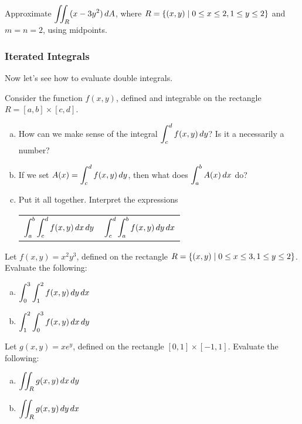\documentclass[notes]{subfiles}
\begin{document}
		\begin{ex}
			Approximate $\displaystyle \iint_R (x-3y^2)\, dA$, where $R = \left\lbrace (x,y)\mid 0\leq x\leq 2, 1\leq y\leq 2 \right\rbrace$ and $m=n=2$, using midpoints.
		\end{ex}
			\newpage
			
	\subsubsection*{Iterated Integrals}
		Now let's see how to evaluate double integrals.
		\begin{ex}
			Consider the function $f(x,y)$, defined and integrable on the rectangle $R = [a,b]\times[c,d]$.
			\begin{enumerate}[(a)]
				\item How can we make sense of the integral $\displaystyle\int_c^d f(x,y)\, dy$?  Is it a necessarily a number?
				\item If we set $A(x) = \displaystyle\int_c^d f(x,y)\, dy$, then what does $\displaystyle \int_a^b A(x)\, dx$ do?
				\item Put it all together.  Interpret the expressions
					\begin{center}
						\begin{tabular}{cc}
							$\displaystyle \int_a^b\int_c^d f(x,y)\, dx\,dy$ & $\displaystyle \int_c^d\int_a^b f(x,y)\, dy\,dx$
						\end{tabular}
					\end{center}
			\end{enumerate}
		\end{ex}
	
		\begin{ex}
			Let $f(x,y) = x^2y^3$, defined on the rectangle $R = \left\lbrace (x,y)\mid 0\leq x\leq 3,1\leq y\leq 2 \right\rbrace$. Evaluate the following:
			\begin{enumerate}[(a)]
				\item $\displaystyle \int_0^3 \int_1^2 f(x,y)\,dy\,dx$
					\vs{1}
					\newpage
					
				\item $\displaystyle \int_1^2\int_0^3 f(x,y)\,dx\,dy$
					\vs{1}
			\end{enumerate}
		\end{ex}
		
		\begin{ex}
			Let $g(x,y) = xe^y$, defined on the rectangle $[0,1]\times[-1,1]$.  Evaluate the following:
			\begin{enumerate}[(a)]
				\item $\displaystyle \iint_R g(x,y)\,dx\,dy$
					
				\item $\displaystyle \iint_R g(x,y)\,dy\,dx$
					\vs{1}
			\end{enumerate}
		\end{ex}
			\newpage
			
\end{document}
